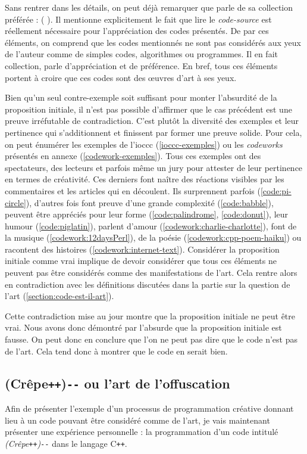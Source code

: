 \documentclass[12pt]{article} %
\newcommand{\p}{\texttt{+}} %
\newcommand{\doublep}{\texttt{++}} %
\newcommand{\doublem}{\texttt{-}\texttt{-} \space} %
\begin{document}
Sans rentrer dans les détails, on peut déjà remarquer que \citeauthor{MEnriqueBermudez-bio} parle de sa collection préférée : ( \cite{MEnriqueBermudez-bio}). Il mentionne explicitement le fait que lire le \textit{code-source} est réellement nécessaire pour l'appréciation des codes présentés. De par ces éléments, on comprend que les codes mentionnés ne sont pas considérés aux yeux de l'auteur comme de simples codes, algorithmes ou programmes. Il en fait collection, parle d'appréciation et de préférence. En bref, tous ces éléments portent à croire que ces codes sont des œuvres d'art à ses yeux.

Bien qu'un seul contre-exemple soit suffisant pour monter l'absurdité de la proposition initiale, il n'est pas possible d'affirmer que le cas précédent est une preuve irréfutable de contradiction. C'est plutôt la diversité des exemples et leur pertinence qui s'additionnent et finissent par former une preuve solide. Pour cela, on peut énumérer les exemples de l'\acrshort{ioccc} (\ref{ioccc-exemples}) ou les \textit{codeworks} présentés en annexe (\ref{codework-exemples}). Tous ces exemples ont des spectateurs, des lecteurs et parfois même un jury pour attester de leur pertinence en termes de créativité. Ces derniers font naître des réactions visibles par les commentaires et les articles qui en découlent. Ils surprennent parfois (\ref{code:pi-circle}), d'autres fois font preuve d'une grande complexité (\ref{code:babble}), peuvent être appréciés pour leur forme (\ref{code:palindrome}, \ref{code:donut}), leur humour (\ref{code:piglatin}), parlent d'amour (\ref{codework:charlie-charlotte}), font de la musique (\ref{codework:12daysPerl}), de la poésie (\ref{codework:cpp-poem-haiku}) ou racontent des histoires (\ref{codework:internet-text}). Considérer la proposition initiale comme vrai implique de devoir considérer que tous ces éléments ne peuvent pas être considérés comme des manifestations de l'art. Cela rentre alors en contradiction avec les définitions discutées dans la partie sur la question de l'art (\ref{section:code-est-il-art}). 

Cette contradiction mise au jour montre que la proposition initiale ne peut être vrai. Nous avons donc démontré par l'absurde que la proposition initiale est fausse. On peut donc en conclure que l'on ne peut pas dire que le code n'est pas de l'art. Cela tend donc à montrer que le code en serait bien.

\subsection{(Crêpe\doublep)\doublem ou l'art de l'offuscation} \label{section:crepepp}
Afin de présenter l'exemple d'un processus de programmation créative donnant lieu à un code pouvant être considéré comme de l'art, je vais maintenant présenter une expérience personnelle : la programmation d'un code intitulé \textit{(Crêpe\doublep)\doublem} dans le langage C\p\p. 
\end{document}
